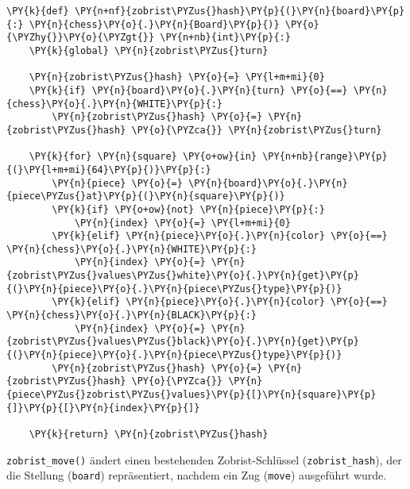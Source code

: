 \bigskip

    \begin{tcolorbox}[fontupper=\linespread{.66}\selectfont, breakable, size=fbox, boxrule=1pt, pad at break*=1mm,colback=cellbackground, colframe=cellborder]
\begin{Verbatim}[commandchars=\\\{\}]
\PY{k}{def} \PY{n+nf}{zobrist\PYZus{}hash}\PY{p}{(}\PY{n}{board}\PY{p}{:} \PY{n}{chess}\PY{o}{.}\PY{n}{Board}\PY{p}{)} \PY{o}{\PYZhy{}}\PY{o}{\PYZgt{}} \PY{n+nb}{int}\PY{p}{:}
    \PY{k}{global} \PY{n}{zobrist\PYZus{}turn}

    \PY{n}{zobrist\PYZus{}hash} \PY{o}{=} \PY{l+m+mi}{0}
    \PY{k}{if} \PY{n}{board}\PY{o}{.}\PY{n}{turn} \PY{o}{==} \PY{n}{chess}\PY{o}{.}\PY{n}{WHITE}\PY{p}{:}
        \PY{n}{zobrist\PYZus{}hash} \PY{o}{=} \PY{n}{zobrist\PYZus{}hash} \PY{o}{\PYZca{}} \PY{n}{zobrist\PYZus{}turn}

    \PY{k}{for} \PY{n}{square} \PY{o+ow}{in} \PY{n+nb}{range}\PY{p}{(}\PY{l+m+mi}{64}\PY{p}{)}\PY{p}{:}
        \PY{n}{piece} \PY{o}{=} \PY{n}{board}\PY{o}{.}\PY{n}{piece\PYZus{}at}\PY{p}{(}\PY{n}{square}\PY{p}{)}
        \PY{k}{if} \PY{o+ow}{not} \PY{n}{piece}\PY{p}{:}
            \PY{n}{index} \PY{o}{=} \PY{l+m+mi}{0}
        \PY{k}{elif} \PY{n}{piece}\PY{o}{.}\PY{n}{color} \PY{o}{==} \PY{n}{chess}\PY{o}{.}\PY{n}{WHITE}\PY{p}{:}
            \PY{n}{index} \PY{o}{=} \PY{n}{zobrist\PYZus{}values\PYZus{}white}\PY{o}{.}\PY{n}{get}\PY{p}{(}\PY{n}{piece}\PY{o}{.}\PY{n}{piece\PYZus{}type}\PY{p}{)}
        \PY{k}{elif} \PY{n}{piece}\PY{o}{.}\PY{n}{color} \PY{o}{==} \PY{n}{chess}\PY{o}{.}\PY{n}{BLACK}\PY{p}{:}
            \PY{n}{index} \PY{o}{=} \PY{n}{zobrist\PYZus{}values\PYZus{}black}\PY{o}{.}\PY{n}{get}\PY{p}{(}\PY{n}{piece}\PY{o}{.}\PY{n}{piece\PYZus{}type}\PY{p}{)}
        \PY{n}{zobrist\PYZus{}hash} \PY{o}{=} \PY{n}{zobrist\PYZus{}hash} \PY{o}{\PYZca{}} \PY{n}{piece\PYZus{}zobrist\PYZus{}values}\PY{p}{[}\PY{n}{square}\PY{p}{]}\PY{p}{[}\PY{n}{index}\PY{p}{]}

    \PY{k}{return} \PY{n}{zobrist\PYZus{}hash}
\end{Verbatim}
\end{tcolorbox}

    \texttt{zobrist\_move()} ändert einen bestehenden Zobrist-Schlüssel
(\texttt{zobrist\_hash}), der die Stellung (\texttt{board})
repräsentiert, nachdem ein Zug (\texttt{move}) ausgeführt wurde.

